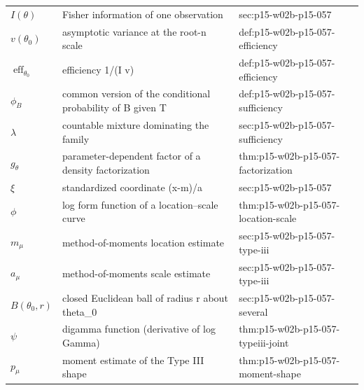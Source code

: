 \begin{longtable}{@{}p{}p{}p{}@{}}
\(I(\theta)\) & Fisher information of one observation & sec:\allowbreak{}p15-\allowbreak{}w02b-\allowbreak{}p15-\allowbreak{}057 \\
\(v(\theta_0)\) & asymptotic variance at the root-n scale & def:\allowbreak{}p15-\allowbreak{}w02b-\allowbreak{}p15-\allowbreak{}057-\allowbreak{}efficiency \\
\(\operatorname{eff}_{\theta_0}\) & efficiency 1/(I v) & def:\allowbreak{}p15-\allowbreak{}w02b-\allowbreak{}p15-\allowbreak{}057-\allowbreak{}efficiency \\
\(\phi_B\) & common version of the conditional probability of B given T & def:\allowbreak{}p15-\allowbreak{}w02b-\allowbreak{}p15-\allowbreak{}057-\allowbreak{}sufficiency \\
\(\lambda\) & countable mixture dominating the family & sec:\allowbreak{}p15-\allowbreak{}w02b-\allowbreak{}p15-\allowbreak{}057-\allowbreak{}sufficiency \\
\(g_\theta\) & parameter-dependent factor of a density factorization & thm:\allowbreak{}p15-\allowbreak{}w02b-\allowbreak{}p15-\allowbreak{}057-\allowbreak{}factorization \\
\(\xi\) & standardized coordinate (x-m)/a & sec:\allowbreak{}p15-\allowbreak{}w02b-\allowbreak{}p15-\allowbreak{}057 \\
\(\phi\) & log form function of a location--scale curve & thm:\allowbreak{}p15-\allowbreak{}w02b-\allowbreak{}p15-\allowbreak{}057-\allowbreak{}location-\allowbreak{}scale \\
\(m_\mu\) & method-of-moments location estimate & sec:\allowbreak{}p15-\allowbreak{}w02b-\allowbreak{}p15-\allowbreak{}057-\allowbreak{}type-\allowbreak{}iii \\
\(a_\mu\) & method-of-moments scale estimate & sec:\allowbreak{}p15-\allowbreak{}w02b-\allowbreak{}p15-\allowbreak{}057-\allowbreak{}type-\allowbreak{}iii \\
\(B(\theta_0,\allowbreak r)\) & closed Euclidean ball of radius r about theta\_0 & sec:\allowbreak{}p15-\allowbreak{}w02b-\allowbreak{}p15-\allowbreak{}057-\allowbreak{}several \\
\(\psi\) & digamma function (derivative of log Gamma) & thm:\allowbreak{}p15-\allowbreak{}w02b-\allowbreak{}p15-\allowbreak{}057-\allowbreak{}typeiii-\allowbreak{}joint \\
\(p_\mu\) & moment estimate of the Type III shape & thm:\allowbreak{}p15-\allowbreak{}w02b-\allowbreak{}p15-\allowbreak{}057-\allowbreak{}moment-\allowbreak{}shape \\

\end{longtable}
